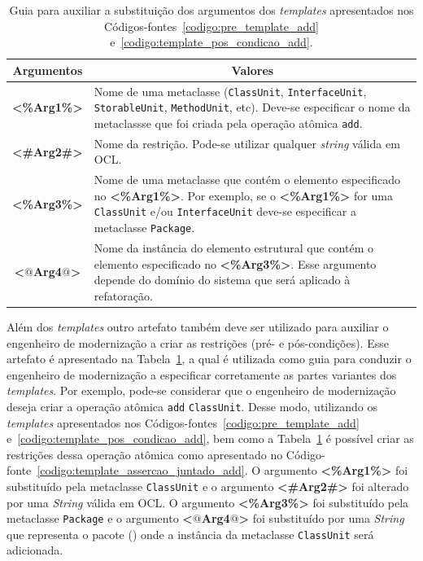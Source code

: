 \begin{table}[h]
\centering
\caption{Guia para auxiliar a substituição dos argumentos dos \textit{templates} apresentados nos Códigos-fontes~\ref{codigo:pre_template_add} e~\ref{codigo:template_pos_condicao_add}.}
\label{tab:guia_template_pre_pos_add}
\begin{tabular}{ | m{1.7cm} | m{12cm}| } 
\hline
\multicolumn{1}{|c|}{Argumentos}                                         & \multicolumn{1}{c|}{Valores} \\ \hline
\multicolumn{1}{|c|}{\textbf{<\%Arg1\%>}} & Nome de uma metaclasse (\texttt{ClassUnit}, \texttt{InterfaceUnit}, \texttt{StorableUnit}, \texttt{MethodUnit}, etc). Deve-se especificar o nome da metaclassse que foi criada pela operação atômica \texttt{add}. \\ 
\hline
\multicolumn{1}{|c|}{\textbf{<\#Arg2\#>}} & Nome da restrição. Pode-se utilizar qualquer \textit{string} válida em OCL. \\ 
\hline
\multicolumn{1}{|c|}{\textbf{<\%Arg3\%>}} & Nome de uma metaclasse que contém o elemento especificado no \textbf{<\%Arg1\%>}. Por exemplo, se o \textbf{<\%Arg1\%>} for uma \texttt{ClassUnit} e/ou \texttt{InterfaceUnit} deve-se especificar a metaclasse \texttt{Package}. \\ 
\hline
\multicolumn{1}{|c|}{\textbf{<$@$Arg4$@$>}} & Nome da instância do elemento estrutural que contém o elemento especificado no \textbf{<\%Arg3\%>}. Esse argumento depende do domínio do sistema que será aplicado à refatoração. \\ 
\hline
\end{tabular}
\end{table}

Além dos \textit{templates} outro artefato também deve ser utilizado para auxiliar o engenheiro de modernização a criar as restrições (pré- e pós-condições). Esse artefato é apresentado na Tabela~\ref{tab:guia_template_pre_pos_add}, a qual é utilizada como guia para conduzir o engenheiro de modernização a especificar corretamente as partes variantes dos \textit{templates}. Por exemplo, pode-se considerar que o engenheiro de modernização deseja criar a operação atômica \texttt{add} \texttt{ClassUnit}. Desse modo, utilizando os \textit{templates} apresentados nos Códigos-fontes~\ref{codigo:pre_template_add} e~\ref{codigo:template_pos_condicao_add}, bem como a Tabela~\ref{tab:guia_template_pre_pos_add} é possível criar as restrições dessa operação atômica como apresentado no Código-fonte~\ref{codigo:template_assercao_juntado_add}. O argumento \textbf{<\%Arg1\%>} foi substituído pela metaclasse \texttt{ClassUnit} e o argumento \textbf{<\#Arg2\#>} foi alterado por uma \textit{String} válida em OCL. O argumento \textbf{<\%Arg3\%>} foi substituído pela metaclasse \texttt{Package} e o  argumento \textbf{<$@$Arg4$@$>} foi  substituído por uma \textit{String} que representa o pacote () onde a instância da metaclasse \texttt{ClassUnit} será adicionada.


